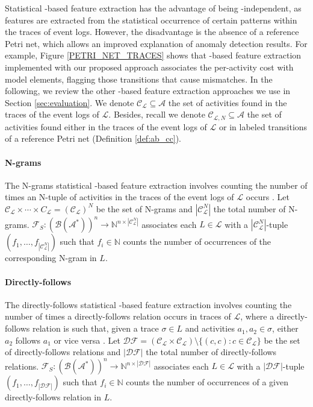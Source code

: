 Statistical -based feature extraction has the advantage of being -independent, as features are extracted from the statistical occurrence of certain patterns within the traces of event logs. However, the disadvantage is the absence of a reference Petri net, which allows an improved explanation of anomaly detection results. For example, Figure \ref{PETRI_NET_TRACES} shows that  -based feature extraction implemented with our proposed approach associates the per-activity cost with model elements, flagging those transitions that cause mismatches. In the following, we review the other -based feature extraction approaches we use in Section \ref{sec:evaluation}. We denote $\mathcal{C}_{\mathcal{L}}\subseteq\mathcal{A}$ the set of activities found in the traces of the event logs of $\mathcal{L}$. Besides, recall we denote $\mathcal{C}_{\mathcal{L},N}\subseteq\mathcal{A}$ the set of activities found either in the traces of the event logs of $\mathcal{L}$ or in labeled transitions of a reference Petri net (Definition \ref{def:ab_cc}).

\paragraph{N-grams} The N-grams statistical -based feature extraction involves counting the number of times an N-tuple of activities in the traces of the event logs of $\mathcal{L}$ occurs \cite{tavares2023pmtraceencoding}. Let $\mathcal{C}_{\mathcal{L}}\times\cdots\times C_{\mathcal{L}}=(\mathcal{C}_{\mathcal{L}})^N$ be the set of N-grams and $|\mathcal{C}_{\mathcal{L}}^N|$ the total number of N-grams. $\mathcal{F}_S:(\mathcal{B}(\mathcal{\mathcal{A}^*}))^n\rightarrow\mathbb{N}^{n\times |\mathcal{C}_{\mathcal{L}}^N|}$ associates each $L\in\mathcal{L}$ with a $|\mathcal{C}_{\mathcal{L}}^N|$-tuple $(f_1,\dots, f_{|\mathcal{C}_{\mathcal{L}}^N|})$ such that $f_i\in\mathbb{N}$ counts the number of occurrences of the corresponding N-gram in $L$.

\paragraph{Directly-follows} The directly-follows statistical -based feature extraction involves counting the number of times a directly-follows relation occurs in traces of $\mathcal{L}$, where a directly-follows relation is such that, given a trace $\sigma\in L$ and activities $a_1,a_2\in\sigma$, either $a_2$ follows $a_1$ or vice versa \cite{aalst2022pmhandbook}. Let $\mathcal{DF}=(\mathcal{C}_{\mathcal{L}}\times \mathcal{C}_{\mathcal{L}})\setminus\{(c,c):c\in \mathcal{C}_{\mathcal{L}}\}$ be the set of directly-follows relations and $|\mathcal{DF}|$ the total number of directly-follows relations. $\mathcal{F}_S:(\mathcal{B}(\mathcal{\mathcal{A}^*}))^n\rightarrow\mathbb{N}^{n\times|\mathcal{DF}|}$ associates each $L\in\mathcal{L}$ with a $|\mathcal{DF}|$-tuple $(f_1,\dots,f_{|\mathcal{DF}|})$ such that $f_i\in\mathbb{N}$ counts the number of occurrences of a given directly-follows relation in $L$.

